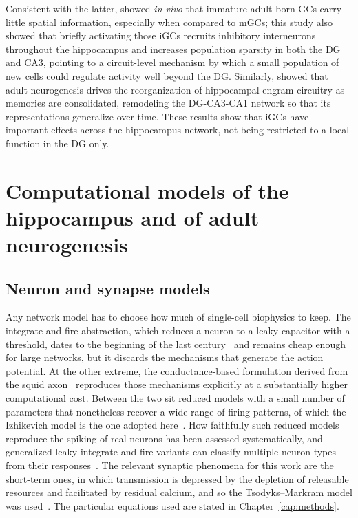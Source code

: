 Consistent with the latter, \textcite{mchughAdultborn2022} showed \textit{in vivo} that immature adult-born GCs carry little
spatial information, especially when compared to mGCs; this study also showed that briefly activating those iGCs recruits
inhibitory interneurons throughout the hippocampus and increases population sparsity in both the DG and CA3, pointing to a
circuit-level mechanism by which a small population of new cells could regulate activity well beyond the DG\@. Similarly,
\textcite{koSystems2025} showed that adult neurogenesis drives the reorganization of hippocampal engram circuitry as memories are
consolidated, remodeling the DG-CA3-CA1 network so that its representations generalize over time. These results show that iGCs
have important effects across the hippocampus network, not being restricted to a local function in the DG only.

\section{Computational models of the hippocampus and of adult neurogenesis}

\subsection{Neuron and synapse models}

Any network model has to choose how much of single-cell biophysics to keep. The integrate-and-fire abstraction, which reduces a
neuron to a leaky capacitor with a threshold, dates to the beginning of the last century~\parencite{lapicqueRecherches1907,
abbottLapicque1999} and remains cheap enough for large networks, but it discards the mechanisms that generate the action
potential. At the other extreme, the conductance-based formulation derived from the squid axon~\parencite{hodgkinQuantitative1952}
reproduces those mechanisms explicitly at a substantially higher computational cost. Between the two sit reduced models with a
small number of parameters that nonetheless recover a wide range of firing patterns, of which the Izhikevich model is the one
adopted here~\parencite{izhikevichSimple2003, izhikevichDynamical2006}. How faithfully such reduced models reproduce the spiking
of real neurons has been assessed systematically, and generalized leaky integrate-and-fire variants can classify multiple neuron
types from their responses~\parencite{gerstnerHow2009, teeterGeneralized2018}. The relevant synaptic phenomena for this work are
the short-term ones, in which transmission is depressed by the depletion of releasable resources and facilitated by residual
calcium, and so the Tsodyks--Markram model was used~\parencite{tsodyksNeural1998, zuckerShortTerm2002}. The particular equations
used are stated in Chapter~\ref{cap:methods}.

